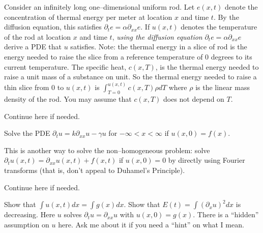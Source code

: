 \documentclass[12pt]{exam}
\newcommand{\px}{\partial_x}
\newcommand{\pt}{\partial_t}
\newcommand{\pxx}{\partial_{xx}}
\begin{document}
\newpage 
\begin{questions}
\begin{question}
Consider an infinitely long one--dimensional uniform rod. Let $e(x,t)$ denote the concentration of thermal energy 
per meter at location $x$ and time $t$. By the diffusion equation, this satisfies $\pt e = \alpha \pxx e$. If 
$u(x,t)$ denotes the temperature of the rod at location $x$ and time $t$, \textit{using the diffusion equation}
$\pt e = \alpha \pxx e$ derive a PDE that $u$ satisfies. Note: the thermal energy in a slice of rod is the 
energy needed to raise the slice from a reference temperature of $0$ degrees to its current temperature. The 
specific heat, $c(x,T)$, is the thermal energy needed to raise a unit mass of a substance on unit. So the thermal
energy needed to raise a thin slice from $0$ to $u(x,t)$ is $\int_{T=0}^{u(x,t)}c(x,T) \rho dT$ where $\rho$ 
is the linear mass density of the rod. You may assume that $c(x,T)$ does not depend on $T$. 
\end{question}
\begin{solutionorbox}[\stretch{1}]
\end{solutionorbox}

\newpage 
\begin{solutionorbox}[\stretch{1}]
Continue here if needed. 
\end{solutionorbox}

\newpage 
\begin{question}
Solve the PDE $\pt u = k \pxx u - \gamma u$ for $-\infty < x < \infty$ if $u(x,0) = f(x)$. 
\end{question}
\begin{solutionorbox}[\stretch{1}]
\end{solutionorbox}

\newpage 
\begin{question}
This is another way to solve the non--homogeneous problem: solve $\pt u(x,t) = \pxx u(x,t) + f(x,t)$ if 
$u(x,0) = 0$ by directly using Fourier transforms (that is, don't appeal to Duhamel's Principle). 
\end{question}
\begin{solutionorbox}[\stretch{1}]
\end{solutionorbox}

\newpage 
\begin{solutionorbox}[\stretch{1}]
Continue here if needed. 
\end{solutionorbox}

\newpage 
\begin{question}
Show that $\int u(x,t)dx = \int g(x)dx$. Show that $E(t) = \int (\px u)^2 dx$ is decreasing. Here
$u$ solves $\pt u = \pxx u$ with $u(x,0) = g(x)$. There is a
``hidden'' assumption on $u$ here. Ask me about it if you need
a ``hint'' on what I mean.
\end{question}
\begin{solutionorbox}[\stretch{1}]
\end{solutionorbox}


\end{questions}
\end{document}
